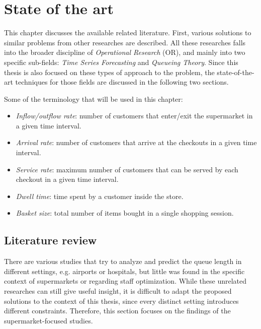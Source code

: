 \chapter{State of the art}
\label{cha:state_of_the_art}

This chapter discusses the available related literature. First, various solutions to similar problems from other researches are described. All these researches falls into the broader discipline of \emph{Operational Research} (OR), and mainly into two specific sub-fields: \emph{Time Series Forecasting} and \emph{Queueing Theory}. Since this thesis is also focused on these types of approach to the problem, the state-of-the-art techniques for those fields are discussed in the following two sections.

Some of the terminology that will be used in this chapter:
\begin{itemize}
  \item \emph{Inflow/outflow rate}: number of customers that enter/exit the supermarket in a given time interval.
  \item \emph{Arrival rate}: number of customers that arrive at the checkouts in a given time interval.
  \item \emph{Service rate}: maximum number of customers that can be served by each checkout in a given time interval.
  \item \emph{Dwell time}: time spent by a customer inside the store.
  \item \emph{Basket size}: total number of items bought in a single shopping session.
\end{itemize}

\section{Literature review}
\label{sec:literature_review}

There are various studies that try to analyze and predict the queue length in different settings, e.g. airports or hospitals, but little was found in the specific context of supermarkets or regarding staff optimization. While these unrelated researches can still give useful insight, it is difficult to adapt the proposed solutions to the context of this thesis, since every distinct setting introduces different constraints. Therefore, this section focuses on the findings of the supermarket-focused studies.

